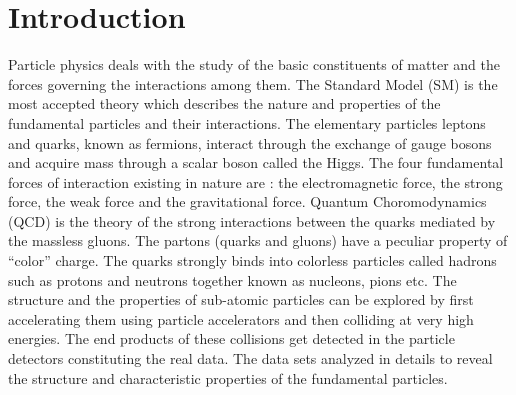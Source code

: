 \chapter{Introduction}
\label{chap:Introduction}

Particle physics deals with the study of the basic constituents of matter and the forces governing the interactions among them. The Standard Model (SM) is the most accepted theory which describes the nature and properties of the fundamental particles and their interactions. The elementary particles leptons and quarks, known as fermions, interact through the exchange of gauge bosons and acquire mass through a scalar boson called the Higgs. The four fundamental forces of interaction existing in nature are : the electromagnetic force, the strong force, the weak force and the gravitational force. Quantum Choromodynamics (QCD) is the theory of the strong interactions between the quarks mediated by the massless gluons. The partons (quarks and gluons) have a peculiar property of ``color'' charge. The quarks strongly binds into colorless particles called hadrons such as protons and neutrons together known as nucleons, pions etc. The structure and the properties of sub-atomic particles can be explored by first accelerating them using particle accelerators and then colliding at very high energies. The end products of these collisions get detected in the particle detectors constituting the real data. The data sets analyzed in details to reveal the structure and characteristic properties of the fundamental particles.

